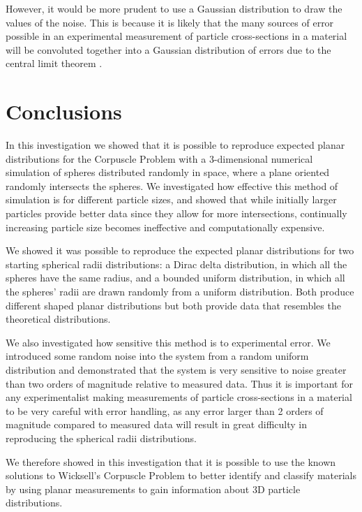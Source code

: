 \documentclass[journal]{IEEEtran}
\begin{document}
However, it would be more prudent to use a Gaussian distribution to draw the
values of the noise. This is because it is likely that the many sources of error
possible in an experimental measurement of particle cross-sections in a material
will be convoluted together into a Gaussian distribution of errors due to the
central limit theorem . 

\section{Conclusions}
In this investigation we showed that it is possible to reproduce expected planar
distributions for the Corpuscle Problem with a 3-dimensional numerical
simulation of spheres distributed randomly in space, where a plane oriented
randomly intersects the spheres. We investigated how effective this method of
simulation is for different particle sizes, and showed that while initially
larger particles provide better data since they allow for more intersections,
continually increasing particle size becomes ineffective and computationally
expensive. 

We showed it was possible to reproduce the expected planar distributions for two
starting spherical radii distributions: a Dirac delta distribution, in which all
the spheres have the same radius, and a bounded uniform distribution, in which
all the spheres' radii are drawn randomly from a uniform distribution. Both
produce different shaped planar distributions but both provide data that
resembles the theoretical distributions.

We also investigated how sensitive this method is to experimental error. We
introduced some random noise into the system from a random uniform distribution
and demonstrated that the system is very sensitive to noise greater than two
orders of magnitude relative to measured data. Thus it is important for any
experimentalist making measurements of particle cross-sections in a material to
be very careful with error handling, as any error larger than 2 orders of
magnitude compared to measured data will result in great difficulty in
reproducing the spherical radii distributions.

We therefore showed in this investigation that it is possible to use the known
solutions to Wicksell's Corpuscle Problem to better identify and classify
materials by using planar measurements to gain information about 3D particle
distributions. 


\end{document}
